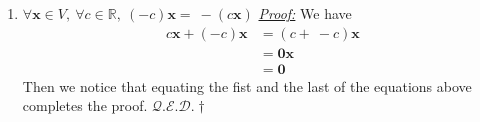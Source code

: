 \documentclass[oneside, 12pt]{book}
\newcommand{\qed}{\hfill $\mathcal{Q}.\mathcal{E}.\mathcal{D}.\dagger$}
\newcommand{\tit}[1]{\textit{#1}}
\newcommand{\proof}{\tit{\underline{Proof:}}} %
\newcommand{\vx}{\mathbf{x}}
\newcommand{\vzero}{\mathbf{0}}
\begin{document}
\begin{enumerate}
\begin{enumerate}
        \item $\forall \mathbf{x} \in V,~\forall c\in \mathbb{R}, ~(-c)\mathbf{x}=~-(c\mathbf{x})$ \newline
        \proof \newline
        We have
        \begin{align*}
            c\vx + (-c)\vx &= (c +~-c)\vx \\
            &= \vzero\vx \\
            &= \vzero
        \end{align*}
        Then we notice that equating the fist and the last of the equations above completes the proof. \qed
        
    \end{enumerate}
\end{enumerate}
\end{document}
